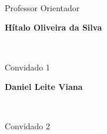 \chapter*{}
\begin{center}
    \centering {\textbf{\MakeUppercase{\theauthor}}}

\vspace{2.5in}

{\textbf{\MakeUppercase{\thetitle}}}

\vspace{0.5in}

\begin{center}
    {\centering \textbf{\thesupervisor} \par}
    \makebox[10cm]{\hrulefill}\\
    {\centering Professor Orientador \par}

    \vspace{0.5in}

    {\centering \textbf{Hítalo Oliveira da Silva} \par}
    \makebox[10cm]{\hrulefill}\\
    {\centering Convidado 1 \par}

    \vspace{0.5in}

    {\centering \textbf{Daniel Leite Viana} \par}
    \makebox[10cm]{\hrulefill}\\
    {\centering Convidado 2 \par}
\end{center}
\end{center}